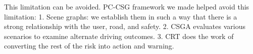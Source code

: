 \documentclass{article}
\begin{document}
This limitation can be avoided. PC-CSG framework we made helped avoid this limitation:
1. Scene graphs: we establish them in such a way that there is a strong relationship with the user, road, and safety.
2. CSGA evaluates various scenarios to examine alternate driving outcomes.
3. CRT does the work of converting the rest of the risk into action and warning.
\end{document}
